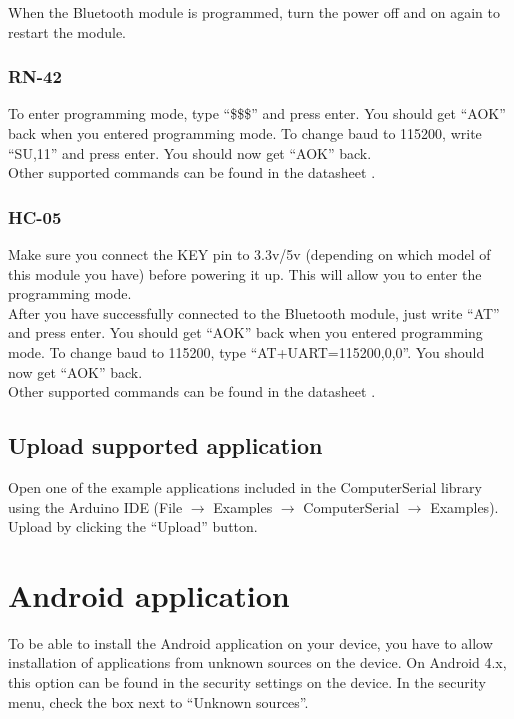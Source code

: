 			When the Bluetooth module is programmed, turn the power off and on again to restart the module.
			
				\subsubsection{RN-42}
				To enter programming mode, type ``\$\$\$'' and press enter. You should get ``AOK'' back when you entered programming mode. To change baud to 115200, write ``SU,11'' and press enter. You should now get ``AOK'' back.\\
				
				Other supported commands can be found in the datasheet \cite{rn-42-at-commands}.

				\subsubsection{HC-05}
				Make sure you connect the KEY pin to 3.3v/5v (depending on which model of this module you have) before powering it up. This will allow you to enter the programming mode.\\
				
				After you have successfully connected to the Bluetooth module, just write ``AT'' and press enter. You should get ``AOK'' back when you entered programming mode. To change baud to 115200, type ``AT+UART=115200,0,0''. You should now get ``AOK'' back.\\
				
				Other supported commands can be found in the datasheet \cite{hc-05-at-commands}.
			
			\subsection{Upload supported application}\label{sec:upload-application}
			Open one of the example applications included in the ComputerSerial library using the Arduino IDE \cite{download-arduino} (File $\rightarrow$ Examples $\rightarrow$ ComputerSerial $\rightarrow$ Examples). Upload by clicking the ``Upload'' button.
				
	\section{Android application}\label{sec:install-android-application}
	To be able to install the Android application on your device, you have to allow installation of applications from unknown sources on the device. On Android 4.x, this option can be found in the security settings on the device. In the security menu, check the box next to ``Unknown sources''. \\

